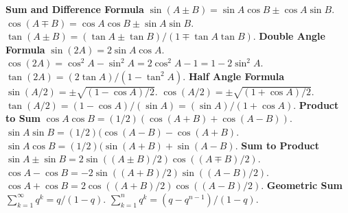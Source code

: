\documentclass[6pt]{article}
\begin{document}
\begin{multicols}{2}
{\bf Sum and Difference Formula} $\sin(A\pm B)=\sin A \cos B\pm \cos A \sin B$. $\cos(A\mp B)=\cos A \cos B\pm \sin A \sin B$. $\tan(A \pm B)=(\tan A\pm \tan B)/(1\mp \tan A \tan B)$.
{\bf Double Angle Formula}  $\sin(2A)=2 \sin A \cos A$. $\cos(2A)=\cos^2 A-\sin^2 A=2 \cos^2 A-1=1-2\sin^2 A$. $\tan(2A)=(2\tan A)/(1-\tan^2 A)$. 
{\bf Half Angle Formula} $\sin(A/2)=\pm \sqrt{(1-\cos A)/2}$. $\cos(A/2)=\pm \sqrt{(1+\cos A)/2}$. $\tan(A/2)=(1-\cos A)/(\sin A) = (\sin A)/(1+\cos A)$. 
{\bf Product to Sum} $\cos A \cos B=(1/2)(\cos(A+B)+\cos(A-B))$. $\sin A \sin B=(1/2)(\cos(A-B)-\cos(A+B)$. $\sin A \cos B=(1/2)(\sin(A+B)+\sin(A-B)$. 
{\bf Sum to Product} $\sin A\pm \sin B=2\sin((A\pm B)/2)\cos((A\mp B)/2)$. $\cos A - \cos B=-2\sin((A+B)/2)\sin((A-B)/2)$. $\cos A + \cos B=2\cos((A+B)/2)\cos((A-B)/2)$. 
{\bf Geometric Sum} $\sum_{k=1}^{\infty}q^k=q/(1-q)$. $\sum_{k=1}^n q^k=(q-q^{n-1})/(1-q)$. \\


\end{multicols}
\end{document}
